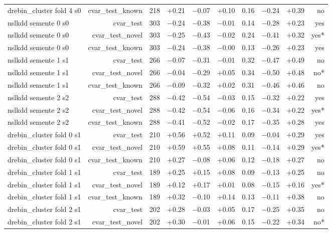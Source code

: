 \begin{table}[t]
\begin{tabular}{lrrrrrrrrr}
drebin\_cluster fold 4 s0 & cvar\_test\_known & 218 & +0.21 & $-$0.07 & +0.10 & 0.16 & $-$0.24 & +0.39 & no \\
nslkdd semente 0 s0 & cvar\_test & 303 & $-$0.24 & $-$0.38 & $-$0.01 & 0.14 & $-$0.28 & +0.23 & yes \\
nslkdd semente 0 s0 & cvar\_test\_novel & 303 & $-$0.25 & $-$0.43 & $-$0.02 & 0.24 & $-$0.41 & +0.32 & yes* \\
nslkdd semente 0 s0 & cvar\_test\_known & 303 & $-$0.24 & $-$0.38 & $-$0.00 & 0.13 & $-$0.26 & +0.23 & yes \\
nslkdd semente 1 s1 & cvar\_test & 266 & $-$0.07 & $-$0.31 & $-$0.01 & 0.32 & $-$0.47 & +0.49 & no \\
nslkdd semente 1 s1 & cvar\_test\_novel & 266 & $-$0.04 & $-$0.29 & +0.05 & 0.34 & $-$0.50 & +0.48 & no* \\
nslkdd semente 1 s1 & cvar\_test\_known & 266 & $-$0.09 & $-$0.32 & +0.02 & 0.31 & $-$0.46 & +0.46 & no \\
nslkdd semente 2 s2 & cvar\_test & 288 & $-$0.42 & $-$0.54 & $-$0.03 & 0.15 & $-$0.32 & +0.22 & yes \\
nslkdd semente 2 s2 & cvar\_test\_novel & 288 & $-$0.42 & $-$0.54 & $-$0.06 & 0.16 & $-$0.34 & +0.22 & yes* \\
nslkdd semente 2 s2 & cvar\_test\_known & 288 & $-$0.41 & $-$0.52 & $-$0.02 & 0.17 & $-$0.35 & +0.28 & yes \\
drebin\_cluster fold 0 s1 & cvar\_test & 210 & +0.56 & +0.52 & +0.11 & 0.09 & $-$0.04 & +0.29 & yes \\
drebin\_cluster fold 0 s1 & cvar\_test\_novel & 210 & +0.59 & +0.55 & +0.08 & 0.11 & $-$0.14 & +0.29 & yes* \\
drebin\_cluster fold 0 s1 & cvar\_test\_known & 210 & +0.27 & $-$0.08 & +0.06 & 0.12 & $-$0.18 & +0.27 & no \\
drebin\_cluster fold 1 s1 & cvar\_test & 189 & +0.25 & +0.15 & +0.08 & 0.09 & $-$0.13 & +0.25 & no \\
drebin\_cluster fold 1 s1 & cvar\_test\_novel & 189 & +0.12 & +0.17 & +0.01 & 0.08 & $-$0.15 & +0.16 & yes* \\
drebin\_cluster fold 1 s1 & cvar\_test\_known & 189 & +0.32 & $-$0.10 & +0.14 & 0.13 & $-$0.11 & +0.38 & no \\
drebin\_cluster fold 2 s1 & cvar\_test & 202 & +0.28 & $-$0.03 & +0.05 & 0.17 & $-$0.25 & +0.35 & no \\
drebin\_cluster fold 2 s1 & cvar\_test\_novel & 202 & +0.30 & $-$0.01 & +0.06 & 0.15 & $-$0.22 & +0.34 & no* \\

\end{tabular}
\end{table}
